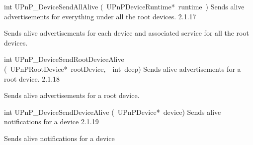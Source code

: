 \documentclass{article}
\begin{document}
\begin{cxxentry}
\begin{cxxentry}
\begin{cxxfunction}
\begin{cxxdoc}
\end{cxxdoc}
\end{cxxfunction}
\begin{cxxfunction}
{int}
        {UPnP\_DeviceSendAllAlive}
        {(\ UPnPDeviceRuntime*\ runtime\ )}
        {Sends alive advertisements for everything under all the root devices. }
        {2.1.17}
\begin{cxxdoc}
Sends alive advertisements for each device and associated service for
all the root devices.


\end{cxxdoc}
\end{cxxfunction}
\begin{cxxfunction}
{int}
        {UPnP\_DeviceSendRootDeviceAlive}
        {(\ UPnPRootDevice*\ rootDevice,\ \ int\ deep)}
        {Sends alive advertisements for a root device.}
        {2.1.18}
\begin{cxxdoc}
Sends alive advertisements for a root device.


\end{cxxdoc}
\end{cxxfunction}
\begin{cxxfunction}
{int}
        {UPnP\_DeviceSendDeviceAlive}
        {(\ UPnPDevice*\ device)}
        {Sends alive notifications for a device}
        {2.1.19}
\begin{cxxdoc}
Sends alive notifications for a device



\end{cxxdoc}
\end{cxxfunction}
\end{cxxentry}
\end{cxxentry}
\end{document}

